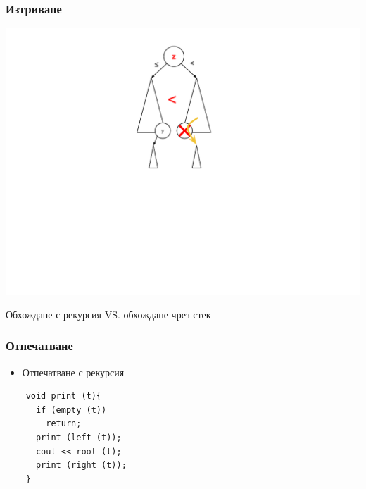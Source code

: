 \documentclass{beamer}
\begin{document}
\begin{frame}[fragile]
\frametitle{Изтриване}

\includegraphics[width=14cm]{images/tree_delete_3}

\end{frame}


\begin{frame}
\centerline{Обхождане с рекурсия VS. обхождане чрез стек}
\end{frame}


\begin{frame}[fragile]
\frametitle{Отпечатване}

\begin{itemize}
  \item Отпечатване с рекурсия 
\end{itemize}

\begin{flushleft}
  \begin{lstlisting}
    void print (t){
      if (empty (t))
        return;
      print (left (t));
      cout << root (t);
      print (right (t));
    }
  \end{lstlisting}
\end{flushleft}

\end{frame}
\end{document}
